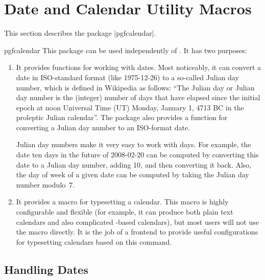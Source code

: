 %
%
%


\section[pgfcalendar]{Date and Calendar Utility Macros}
\label{section-calendar}

This section describes the package |pgfcalendar|.

\begin{package}{pgfcalendar}
    This package can be used independently of \pgfname. It has two purposes:
    \begin{enumerate}
        \item It provides functions for working with dates. Most noticeably, it
            can convert a date in ISO-standard format (like 1975-12-26) to a
            so-called Julian day number, which is defined in Wikipedia as
            follows: ``The Julian day or Julian day number is the (integer)
            number of days that have elapsed since the initial epoch at noon
            Universal Time (UT) Monday, January 1, 4713 BC in the proleptic
            Julian calendar''. The package also provides a function for
            converting a Julian day number to an ISO-format date.

            Julian day numbers make it very easy to work with days. For
            example, the date ten days in the future of 2008-02-20 can be
            computed by converting this date to a Julian day number, adding 10,
            and then converting it back. Also, the day of week of a given date
            can be computed by taking the Julian day number modulo~7.
        \item It provides a macro for typesetting a calendar. This macro is
            highly configurable and flexible (for example, it can produce both
            plain text calendars and also complicated \tikzname-based
            calendars), but most users will not use the macro directly. It is
            the job of a frontend to provide useful configurations for
            typesetting calendars based on this command.
    \end{enumerate}
\end{package}


\subsection{Handling Dates}

